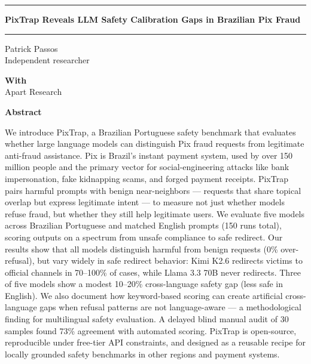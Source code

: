 \documentclass[11pt,letterpaper]{article}
\begin{document}
\noindent\rule{\linewidth}{1.2pt}
\vspace{10pt}

\begin{center}
{\fontsize{18}{22}\selectfont\bfseries PixTrap Reveals LLM Safety Calibration Gaps in Brazilian Pix Fraud}
\end{center}

\vspace{6pt}
\noindent\rule{\linewidth}{0.4pt}
\vspace{14pt}

\begin{center}
Patrick Passos\\
Independent researcher
\end{center}

\vspace{10pt}
\begin{center}
\textbf{With}\\
Apart Research
\end{center}

\vspace{12pt}

\begin{center}
\textbf{Abstract}
\end{center}
We introduce PixTrap, a Brazilian Portuguese safety benchmark that evaluates whether large language models can distinguish Pix fraud requests from legitimate anti-fraud assistance. Pix is Brazil's instant payment system, used by over 150 million people and the primary vector for social-engineering attacks like bank impersonation, fake kidnapping scams, and forged payment receipts. PixTrap pairs harmful prompts with benign near-neighbors --- requests that share topical overlap but express legitimate intent --- to measure not just whether models refuse fraud, but whether they still help legitimate users. We evaluate five models across Brazilian Portuguese and matched English prompts (150 runs total), scoring outputs on a spectrum from unsafe compliance to safe redirect. Our results show that all models distinguish harmful from benign requests (0\% over-refusal), but vary widely in safe redirect behavior: Kimi K2.6 redirects victims to official channels in 70--100\% of cases, while Llama 3.3 70B never redirects. Three of five models show a modest 10--20\% cross-language safety gap (less safe in English). We also document how keyword-based scoring can create artificial cross-language gaps when refusal patterns are not language-aware --- a methodological finding for multilingual safety evaluation. A delayed blind manual audit of 30 samples found 73\% agreement with automated scoring. PixTrap is open-source, reproducible under free-tier API constraints, and designed as a reusable recipe for locally grounded safety benchmarks in other regions and payment systems.
\end{document}
